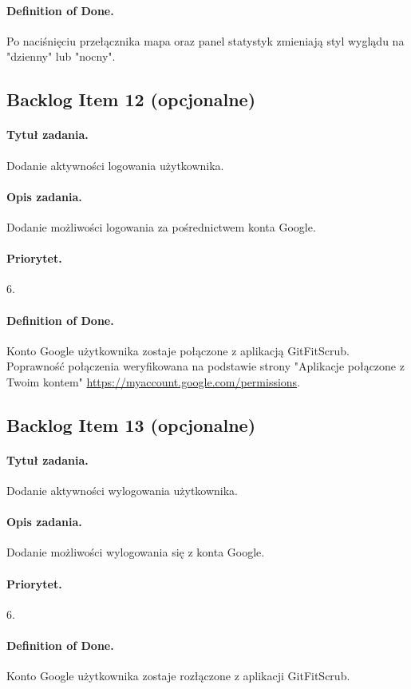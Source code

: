 \documentclass[a4paper]{article}
\begin{document}
\paragraph{Definition of Done.} Po naciśnięciu przełącznika mapa oraz panel statystyk zmieniają styl wyglądu na "dzienny" lub "nocny".

\subsection{Backlog Item 12 (opcjonalne)}
\paragraph{Tytuł zadania.} Dodanie aktywności logowania użytkownika.
\paragraph{Opis zadania.} Dodanie możliwości logowania za pośrednictwem konta Google.
\paragraph{Priorytet.} 6.
\paragraph{Definition of Done.} Konto Google użytkownika zostaje połączone z aplikacją GitFitScrub. Poprawność połączenia weryfikowana na podstawie strony "Aplikacje połączone z Twoim kontem" \url{https://myaccount.google.com/permissions}.

\subsection{Backlog Item 13 (opcjonalne)}
\paragraph{Tytuł zadania.} Dodanie aktywności wylogowania użytkownika.
\paragraph{Opis zadania.} Dodanie możliwości wylogowania się z konta Google.
\paragraph{Priorytet.} 6.
\paragraph{Definition of Done.} Konto Google użytkownika zostaje rozłączone z aplikacji GitFitScrub.
\end{document}
